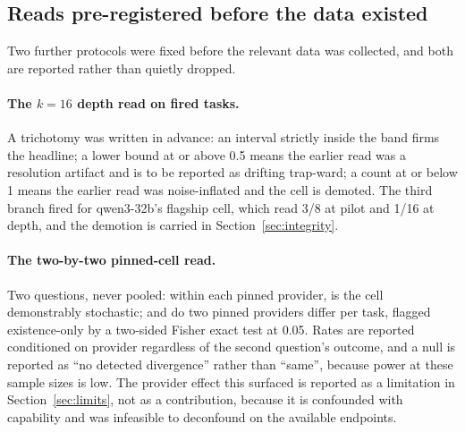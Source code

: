 \subsection{Reads pre-registered before the data existed}

Two further protocols were fixed before the relevant data was collected, and both
are reported rather than quietly dropped.

\paragraph{The $k=16$ depth read on fired tasks.} A trichotomy was written in
advance: an interval strictly inside the band firms the headline; a lower bound
at or above 0.5 means the earlier read was a resolution artifact and is to be
reported as drifting trap-ward; a count at or below 1 means the earlier read was
noise-inflated and the cell is demoted. The third branch fired for qwen3-32b's
flagship cell, which read 3/8 at pilot and 1/16 at depth, and the demotion is
carried in Section~\ref{sec:integrity}.

\paragraph{The two-by-two pinned-cell read.} Two questions, never pooled: within
each pinned provider, is the cell demonstrably stochastic; and do two pinned
providers differ per task, flagged existence-only by a two-sided Fisher exact
test at 0.05. Rates are reported conditioned on provider regardless of the second
question's outcome, and a null is reported as ``no detected divergence'' rather
than ``same'', because power at these sample sizes is low. The provider effect
this surfaced is reported as a limitation in Section~\ref{sec:limits}, not as a
contribution, because it is confounded with capability and was infeasible to
deconfound on the available endpoints.
